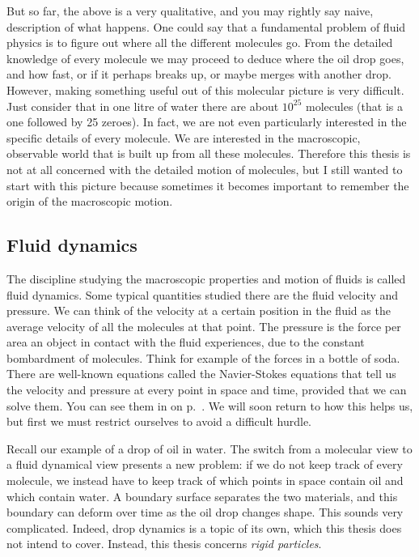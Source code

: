 \documentclass[thesis.tex]{subfiles}
\begin{document}
But so far, the above is a very qualitative, and you may rightly say naive, description of what happens. One could say that a fundamental problem of fluid physics is to figure out where all the different molecules go. From the detailed knowledge of every molecule we may proceed to deduce where the oil drop goes, and how fast, or if it perhaps breaks up, or maybe merges with another drop. However, making something useful out of this molecular picture is very difficult.
Just consider that in one litre of water there are about $10^{25}$ molecules (that is a one followed by 25 zeroes). In fact, we are not even particularly interested in the specific details of every molecule. We are interested in the macroscopic, observable world that is built up from all these molecules. Therefore this thesis is not at all concerned with the detailed motion of molecules, but I still wanted to start with this picture because sometimes it becomes important to remember the origin of the macroscopic motion.


\subsection*{Fluid dynamics}

The discipline studying the macroscopic properties and motion of fluids is called fluid dynamics. Some typical quantities studied there are the fluid velocity and pressure. We can think of the velocity at a certain position in the fluid as the average velocity of all the molecules at that point. The pressure is the force per area an object in contact with the fluid experiences, due to the constant bombardment of molecules. Think for example of the forces in a bottle of soda. There are well-known equations called the Navier-Stokes equations that tell us the velocity and pressure at every point in space and time, provided that we can solve them. You can see them in  on p.~\pageref{eqn:nsintro}. We will soon return to how this helps us, but first we must restrict ourselves to avoid a difficult hurdle.

Recall our example of a drop of oil in water. The switch from a molecular view to a fluid dynamical view presents a new problem: if we do not keep track of every molecule, we instead have to keep track of which points in space contain oil and which contain water. A boundary surface separates the two materials, and this boundary can deform over time as the oil drop changes shape. This sounds very complicated. Indeed, drop dynamics is a topic of its own, which this thesis does not intend to cover. Instead, this thesis concerns \emph{rigid particles}.
\end{document}
